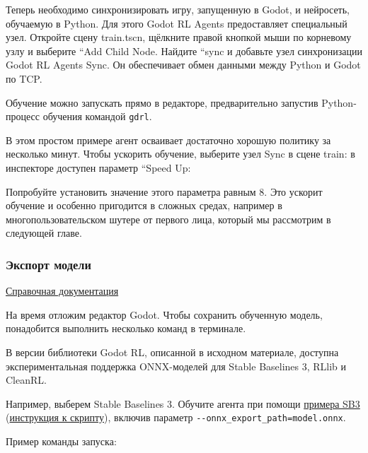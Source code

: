 \documentclass[11pt,a4paper]{article}
\begin{document}
Теперь необходимо синхронизировать игру, запущенную в Godot, и нейросеть, обучаемую в Python. Для этого Godot RL Agents предоставляет специальный узел. Откройте сцену train.tscn, щёлкните правой кнопкой мыши по корневому узлу и выберите ``Add Child Node. Найдите ``sync и добавьте узел синхронизации Godot RL Agents Sync. Он обеспечивает обмен данными между Python и Godot по TCP.

Обучение можно запускать прямо в редакторе, предварительно запустив Python-процесс обучения командой \texttt{gdrl}.

В этом простом примере агент осваивает достаточно хорошую политику за несколько минут. Чтобы ускорить обучение, выберите узел Sync в сцене train: в инспекторе доступен параметр ``Speed Up:


Попробуйте установить значение этого параметра равным 8. Это ускорит обучение и особенно пригодится в сложных средах, например в многопользовательском шутере от первого лица, который мы рассмотрим в следующей главе.

\subsubsection{Экспорт модели}\label{export-model}

\href{https://github.com/edbeeching/godot_rl_agents/tree/main?tab=readme-ov-file\#exporting-and-loading-your-trained-agent-in-onnx-format}{Справочная документация}

На время отложим редактор Godot. Чтобы сохранить обученную модель, понадобится выполнить несколько команд в терминале.

В версии библиотеки Godot RL, описанной в исходном материале, доступна экспериментальная поддержка ONNX-моделей для Stable Baselines 3, RLlib и CleanRL.

Например, выберем Stable Baselines 3. Обучите агента при помощи \href{https://github.com/edbeeching/godot_rl_agents/blob/main/examples/stable_baselines3_example.py}{примера SB3} (\href{https://github.com/edbeeching/godot_rl_agents/blob/main/docs/ADV_STABLE_BASELINES_3.md\#train-a-model-from-scratch}{инструкция к скрипту}), включив параметр \texttt{-\/-onnx\_export\_path=model.onnx}.

Пример команды запуска:
\end{document}
